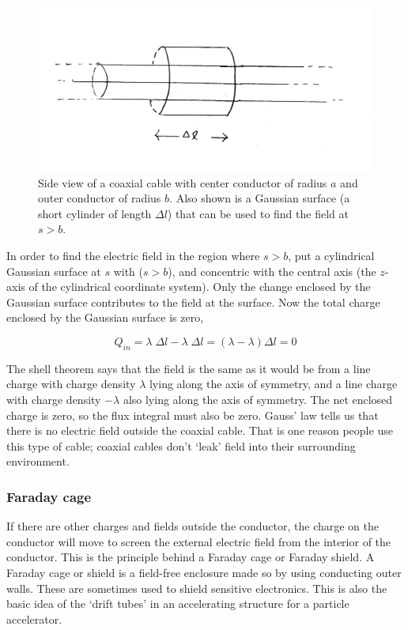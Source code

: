 \documentclass[12pt]{article}
\begin{document}
\begin{flushleft}
\begin{figure}[h]
\centering
\includegraphics*[trim=0cm 0cm 0cm 0cm, clip=true, width=0.6\columnwidth]{coax1.png}
\caption{\small Side view of a coaxial cable with center conductor of radius $a$ and outer conductor of radius $b$.  Also shown is a Gaussian surface (a short cylinder of length $\Delta l$) that can be used to find the field at $s>b$.}
\label{fig:coaxout}
\end{figure}

In order to find the electric field in the region where $s>b$, put a cylindrical Gaussian surface at $s$ with ($s>b$), and concentric with the central axis (the $z$-axis of the cylindrical coordinate system).  Only the change enclosed by the Gaussian surface contributes to the field at the surface.  Now the total charge enclosed by the Gaussian surface is zero,

\begin{equation*}
Q_{in}=\lambda \; \Delta l -\lambda \; \Delta l = (\lambda - \lambda) \Delta l = 0
\end{equation*}

The shell theorem says that the field is the same as it would be from a line charge with charge density $\lambda$ lying along the axis of symmetry, and a line charge with charge density $-\lambda$ also lying along the axis of symmetry.  The net enclosed charge is zero, so the flux integral must also be zero.  Gauss' law tells us that there is no electric field outside the coaxial cable.  That is one reason people use this type of cable; coaxial cables don't `leak' field into their surrounding environment.

\subsubsection*{\bf Faraday cage}

If there are other charges and fields outside the conductor, the charge on the conductor will move to screen the external electric field from the interior of the conductor.  This is the principle behind a Faraday cage or Faraday shield.  A Faraday cage or shield is a field-free enclosure made so by using conducting outer walls.  These are sometimes used to shield sensitive electronics.  This is also the basic idea of the `drift tubes' in an accelerating structure for a particle accelerator.


\end{flushleft}
\end{document}
